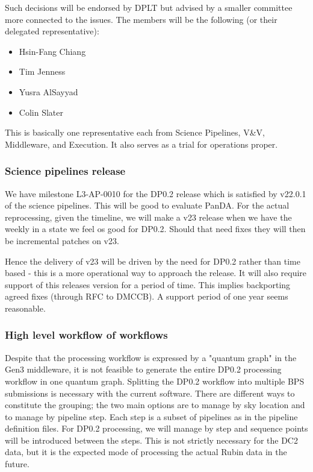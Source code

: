 Such decisions will be endorsed by DPLT but advised by a smaller committee more connected to the issues.
The members will be the following (or their delegated representative):

\begin{itemize}
\item Hsin-Fang Chiang
\item Tim Jenness
\item Yusra AlSayyad
\item Colin Slater
\end{itemize}

This is basically  one representative each from Science Pipelines, V\&V, Middleware, and Execution.
It also serves as a trial for operations proper.

\subsubsection {Science pipelines release} \label{sec:release}
We have milestone L3-AP-0010  for the DP0.2 release which is satisfied by v22.0.1 of the science pipelines. This will be good to evaluate PanDA.
For the actual reprocessing, given the timeline, we will make a v23 release when we have the weekly in a state we feel os good for DP0.2.
Should that need fixes they will then be incremental patches on v23.

Hence the delivery of v23  will be driven by the need for DP0.2 rather than time based - this is a more operational way to approach the release.
It will also require support of this releases version for a period of time. This implies backporting agreed fixes (through RFC to DMCCB). A support period of one year seems reasonable.

\subsubsection {High level workflow of workflows}
Despite that the processing workflow is expressed by a "quantum graph" in the Gen3 middleware, it is not feasible to generate the entire DP0.2 processing workflow in one quantum graph.
Splitting the DP0.2 workflow into multiple BPS submissions is necessary with the current software.
There are different ways to constitute the grouping; the two main options are to manage by sky location and to manage by pipeline step.
Each step is a subset of pipelines as in the pipeline definition files.
For DP0.2 processing, we will manage by step and sequence points will be introduced between the steps.
This is not strictly necessary for the DC2 data, but it is the expected mode of processing the actual Rubin data in the future.

